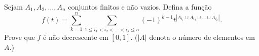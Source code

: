 Sejam \(A_1,A_2,\dots, A_n\) conjuntos finitos e não vazios. Defina a função
\[
f(t)=\sum_{k=1}^n \sum_{1\leq i_1<i_2<\dots<i_k\leq n} (-1)^{k-1}t^{|A_{i_1}\cup A_{i_2}\cup \dots\cup A_{i_k}|}.
\]
Prove que \(f\) é não decrescente em \([0,1].\)
(\(|A|\) denota o número de elementos em \(A.\))
